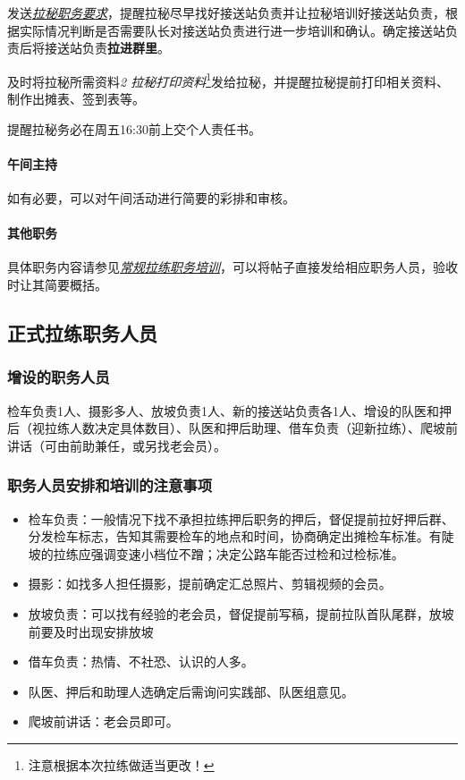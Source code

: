 \documentclass[UTF8]{ctexart}
\begin{document}
发送\href{https://chexie.net/bbs/content/?bid=7&tid=1062&p=1#7}{\textit{拉秘职务要求}}，提醒拉秘尽早找好接送站负责并让拉秘培训好接送站负责，根据实际情况判断是否需要队长对接送站负责进行进一步培训和确认。确定接送站负责后将接送站负责\textbf{拉进群里}。

及时将拉秘所需资料{\color{blue}\textit{2 拉秘打印资料}}\footnote{注意根据本次拉练做适当更改！}发给拉秘，并提醒拉秘提前打印相关资料、制作出摊表、签到表等。

提醒拉秘务必在周五16:30前上交个人责任书。

\paragraph{午间主持} 如有必要，可以对午间活动进行简要的彩排和审核。

\paragraph{其他职务}

具体职务内容请参见\href{https://chexie.net/bbs/content/?bid=7&tid=1062&p=1}{\textit{常规拉练职务培训}}，可以将帖子直接发给相应职务人员，验收时让其简要概括。

\subsection{正式拉练职务人员}

\subsubsection{增设的职务人员}

检车负责1人、摄影多人、放坡负责1人、新的接送站负责各1人、增设的队医和押后（视拉练人数决定具体数目）、队医和押后助理、借车负责（迎新拉练）、爬坡前讲话（可由前助兼任，或另找老会员）。

\subsubsection{职务人员安排和培训的注意事项}

\begin{itemize}[nosep,left=2em]
    \item 检车负责：一般情况下找不承担拉练押后职务的押后，督促提前拉好押后群、分发检车标志，告知其需要检车的地点和时间，协商确定出摊检车标准。有陡坡的拉练应强调变速小档位不蹭；决定公路车能否过检和过检标准。
    \item 摄影：如找多人担任摄影，提前确定汇总照片、剪辑视频的会员。
    \item 放坡负责：可以找有经验的老会员，督促提前写稿，提前拉队首队尾群，放坡前要及时出现安排放坡
    \item 借车负责：热情、不社恐、认识的人多。
    \item 队医、押后和助理人选确定后需询问实践部、队医组意见。
    \item 爬坡前讲话：老会员即可。
\end{itemize}
\end{document}
